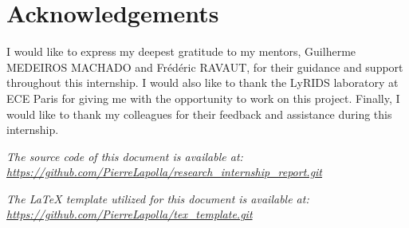 \maketitle
\tableofcontents


\section*{Acknowledgements}\label{sec:acknowledgements}
I would like to express my deepest gratitude to my mentors, Guilherme MEDEIROS MACHADO and Frédéric RAVAUT, for their
guidance and support throughout this internship.
I would also like to thank the LyRIDS laboratory at ECE Paris for giving me with the opportunity to work on this project.
Finally, I would like to thank my colleagues for their feedback and assistance during this internship.

\vfill
\begin{center}
    \textit{The source code of this document is available at:
    \url{https://github.com/PierreLapolla/research_internship_report.git}}

    \textit{The \LaTeX{} template utilized for this document is available at:
    \url{https://github.com/PierreLapolla/tex_template.git}}
\end{center}
\newpage